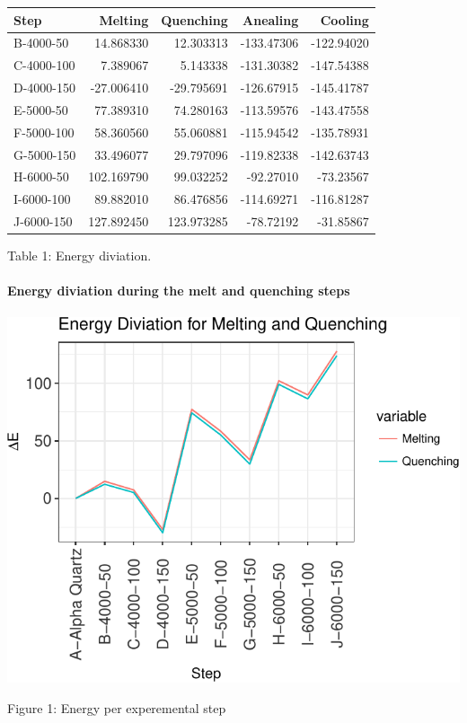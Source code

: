 \documentclass[]{article}
\let\oldparagraph\paragraph
\renewcommand{\paragraph}[1]{\oldparagraph{#1}\mbox{}}
\begin{document}
\begin{longtable}[]{@{}lrrrr@{}}
\toprule
Step & Melting & Quenching & Anealing & Cooling\tabularnewline
\midrule
\endhead
B-4000-50 & 14.868330 & 12.303313 & -133.47306 &
-122.94020\tabularnewline
C-4000-100 & 7.389067 & 5.143338 & -131.30382 &
-147.54388\tabularnewline
D-4000-150 & -27.006410 & -29.795691 & -126.67915 &
-145.41787\tabularnewline
E-5000-50 & 77.389310 & 74.280163 & -113.59576 &
-143.47558\tabularnewline
F-5000-100 & 58.360560 & 55.060881 & -115.94542 &
-135.78931\tabularnewline
G-5000-150 & 33.496077 & 29.797096 & -119.82338 &
-142.63743\tabularnewline
H-6000-50 & 102.169790 & 99.032252 & -92.27010 &
-73.23567\tabularnewline
I-6000-100 & 89.882010 & 86.476856 & -114.69271 &
-116.81287\tabularnewline
J-6000-150 & 127.892450 & 123.973285 & -78.72192 &
-31.85867\tabularnewline
\bottomrule
\end{longtable}

Table 1: Energy diviation.

\hypertarget{energy-diviation-during-the-melt-and-quenching-steps}{%
\paragraph{Energy diviation during the melt and quenching
steps}\label{energy-diviation-during-the-melt-and-quenching-steps}}

\includegraphics{merge_files/figure-latex/Graph: Energy diviation MQ-1.pdf}

Figure 1: Energy per experemental step
\end{document}
